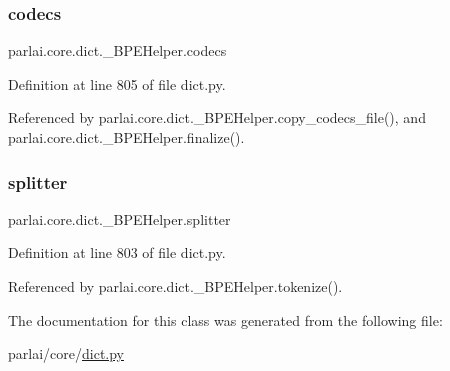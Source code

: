\subsubsection{\texorpdfstring{codecs}{codecs}}
{\footnotesize\ttfamily parlai.\+core.\+dict.\+\_\+\+B\+P\+E\+Helper.\+codecs}



Definition at line 805 of file dict.\+py.



Referenced by parlai.\+core.\+dict.\+\_\+\+B\+P\+E\+Helper.\+copy\+\_\+codecs\+\_\+file(), and parlai.\+core.\+dict.\+\_\+\+B\+P\+E\+Helper.\+finalize().

\mbox{\label{classparlai_1_1core_1_1dict_1_1__BPEHelper_a4982da2af63c5f2e4ca0e17b1693659c}} 
\subsubsection{\texorpdfstring{splitter}{splitter}}
{\footnotesize\ttfamily parlai.\+core.\+dict.\+\_\+\+B\+P\+E\+Helper.\+splitter}



Definition at line 803 of file dict.\+py.



Referenced by parlai.\+core.\+dict.\+\_\+\+B\+P\+E\+Helper.\+tokenize().



The documentation for this class was generated from the following file\+:\begin{DoxyCompactItemize}
\item 
parlai/core/\hyperlink{dict_8py}{dict.\+py}\end{DoxyCompactItemize}
